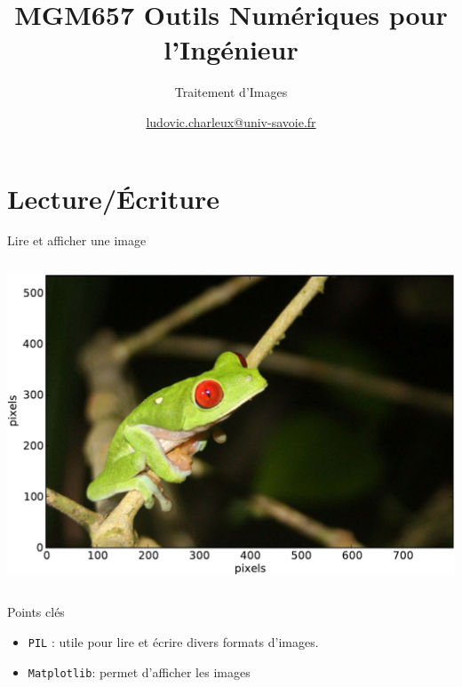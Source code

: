 \documentclass[8pt,a4paper]{beamer}
\author[LC]{\href{mailto:ludovic.charleux@univ-savoie.fr}{ludovic.charleux@univ-savoie.fr}}
\title{MGM657 Outils Numériques pour l'Ingénieur}
\subtitle{Traitement d'Images}
\date{}
\institute{\url{www.polytech.univ-savoie.fr}}
\begin{document}
\begin{frame}[plain]
\titlepage
\tableofcontents
\end{frame}

\section{Lecture/Écriture}
  
\begin{frame}[containsverbatim]{Lire et afficher une image}
  \begin{columns}
  \includegraphics[width=\textwidth]{figures/grenouille.pdf} 
  
  \end{columns}
  \begin{block}{Points clés}
  \begin{itemize}
  \item \verb!PIL! : utile pour lire et écrire divers formats d'images.
  \item \verb!Matplotlib!: permet d'afficher les images
  \end{itemize}
  \end{block}
\end{frame}
\end{document}
